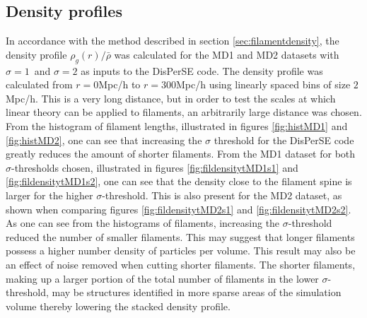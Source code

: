 \subsection{Density profiles}\label{sec:filamentdensityres}
In accordance with the method described in section \ref{sec:filamentdensity}, the density profile $\rho_g(r)/\bar{\rho}$ was calculated for the MD1 and MD2 datasets with $\sigma=1$ and $\sigma=2$ as inputs to the DisPerSE code. The density profile was calculated from $r=0$Mpc/h to $r=300$Mpc/h using linearly spaced bins of size $2$Mpc/h. This is a very long distance, but in order to test the scales at which linear theory can be applied to filaments, an arbitrarily large distance was chosen. From the histogram of filament lengths, illustrated in figures \ref{fig:histMD1} and \ref{fig:histMD2}, one can see that increasing the $\sigma$ threshold for the DisPerSE code greatly reduces the amount of shorter filaments. From the MD1 dataset for both $\sigma$-thresholds chosen, illustrated in figures \ref{fig:fildensitytMD1s1} and \ref{fig:fildensitytMD1s2}, one can see that the density close to the filament spine is larger for the higher $\sigma$-threshold. This is also present for the MD2 dataset, as shown when comparing figures \ref{fig:fildensitytMD2s1} and \ref{fig:fildensitytMD2s2}. As one can see from the histograms of filaments, increasing the $\sigma$-threshold reduced the number of smaller filaments. This may suggest that longer filaments possess a higher number density of particles per volume. This result may also be an effect of noise removed when cutting shorter filaments. The shorter filaments, making up a larger portion of the total number of filaments in the lower $\sigma$-threshold, may be structures identified in more sparse areas of the simulation volume thereby lowering the stacked density profile.\\\indent
